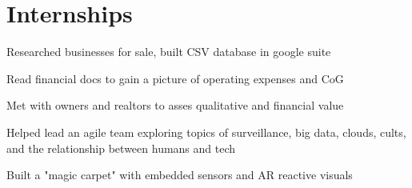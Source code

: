 \documentclass[]{quinnJarvisHollandLatex}
\begin{document}
\begin{minipage}[t]{0.60\textwidth}
\section{Internships}
\begin{tightemize}
\item Researched businesses for sale, built CSV database in google suite
\item Read financial docs to gain a picture of operating expenses and CoG
\item Met with owners and realtors to asses qualitative and financial value
\end{tightemize}
\begin{tightemize}
\item{Helped lead an agile team exploring topics of surveillance, big data, clouds, cults, and the relationship between humans and tech}
\item{Built a "magic carpet"  with embedded sensors and AR reactive visuals}
\end{tightemize}
%
%

\end{minipage}
\hfill
\end{document}
